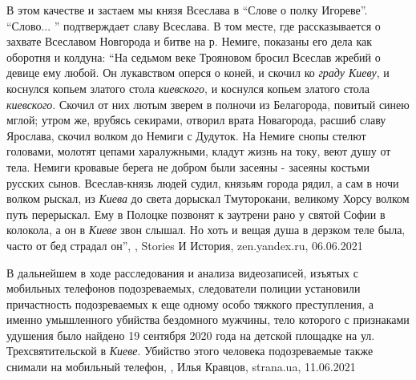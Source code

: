 В этом качестве и застаем мы князя Всеслава в \enquote{Слове о полку Игореве}.
\enquote{Слово... } подтверждает славу Всеслава. В том месте, где
рассказывается о захвате Всеславом Новгорода и битве на р. Немиге, показаны его
дела как оборотня и колдуна: \enquote{На седьмом веке Трояновом бросил Всеслав
жребий о девице ему любой.  Он лукавством оперся о коней, и скочил ко
\emph{граду Киеву}, и коснулся копьем златого стола \emph{киевского}, и
коснулся копьем златого стола \emph{киевского}. Скочил от них лютым зверем в
полночи из Белагорода, повитый синею мглой; утром же, врубясь секирами, отворил
врата Новагорода, расшиб славу Ярослава, скочил волком до Немиги с Дудуток.  На
Немиге снопы стелют головами, молотят цепами харалужными, кладут жизнь на току,
веют душу от тела.  Немиги кровавые берега не добром были засеяны - засеяны
костьми русских сынов.  Всеслав-князь людей судил, князьям города рядил, а сам
в ночи волком рыскал, из \emph{Киева} до света дорыскал Тмуторокани, великому
Хорсу волком путь перерыскал.  Ему в Полоцке позвонят к заутрени рано у святой
Софии в колокола, а он в \emph{Киеве} звон слышал. Но хоть и вещая душа в
дерзком теле была, часто от бед страдал он},
, Stories И История, zen.yandex.ru, 06.06.2021

В дальнейшем в ходе расследования и анализа видеозаписей, изъятых с мобильных
телефонов подозреваемых, следователи полиции установили причастность
подозреваемых к еще одному особо тяжкого преступления, а именно умышленного
убийства бездомного мужчины, тело которого с признаками удушения было найдено
19 сентября 2020 года на детской площадке на ул. Трехсвятительской в
\emph{Киеве}. Убийство этого человека подозреваемые также снимали на мобильный
телефон,
, Илья Кравцов, strana.ua, 11.06.2021

